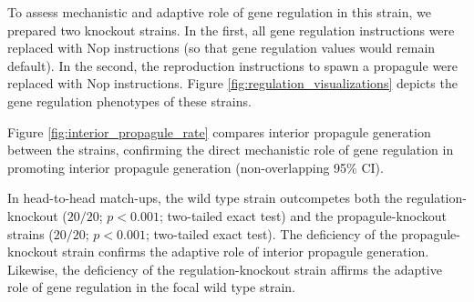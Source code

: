 To assess mechanistic and adaptive role of gene regulation in this strain, we prepared two knockout strains.
In the first, all gene regulation instructions were replaced with Nop instructions (so that gene regulation values would remain default).
In the second, the reproduction instructions to spawn a propagule were replaced with Nop instructions.
Figure \ref{fig:regulation_visualizations} depicts the gene regulation phenotypes of these strains.

Figure \ref{fig:interior_propagule_rate} compares interior propagule generation between the strains, confirming the direct mechanistic role of gene regulation in promoting interior propagule generation (non-overlapping 95\% CI).

In head-to-head match-ups, the wild type strain outcompetes both the regulation-knockout ($20/20$; $p < 0.001$; two-tailed exact test) and the propagule-knockout strains
($20/20$; $p < 0.001$; two-tailed exact test).
The deficiency of the propagule-knockout strain confirms the adaptive role of interior propagule generation.
Likewise, the deficiency of the regulation-knockout strain affirms the adaptive role of gene regulation in the focal wild type strain.
